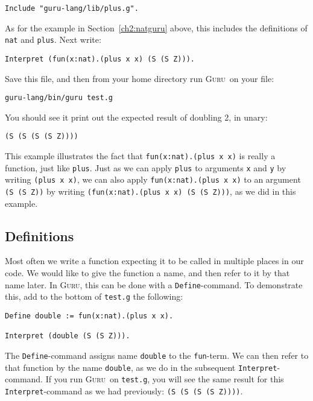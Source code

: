 \documentclass{book}[12pt]
\newcommand{\guru}[0]{\textsc{Guru}}
\begin{document}
\begin{verbatim}
Include "guru-lang/lib/plus.g".
\end{verbatim}

\noindent As for the example in Section~\ref{ch2:natguru} above,
this includes the definitions of \texttt{nat} and \texttt{plus}.
Next write:

\begin{verbatim}
Interpret (fun(x:nat).(plus x x) (S (S Z))).
\end{verbatim}

\noindent Save this file, and then from your home directory run
\guru\ on your file:

\begin{verbatim}
guru-lang/bin/guru test.g
\end{verbatim}

\noindent You should see it print out the expected result of doubling
2, in unary:

\begin{verbatim}
(S (S (S (S Z))))
\end{verbatim}

\noindent This example illustrates the fact that
\texttt{fun(x:nat).(plus x x)} is really a function, just like
\texttt{plus}.  Just as we can apply \texttt{plus} to arguments
\texttt{x} and \texttt{y} by writing \texttt{(plus x x)}, we can also
apply \texttt{fun(x:nat).(plus x x)} to an argument \texttt{(S (S Z))}
by writing \texttt{(fun(x:nat).(plus x x) (S (S Z)))}, as we did in
this example.

\subsection{Definitions}

Most often we write a function expecting it to be called in multiple
places in our code.  We would like to give the function a name, and
then refer to it by that name later.  In \textsc{Guru}, this can be
done with a \texttt{Define}-command. To demonstrate this, add to the
bottom of \texttt{test.g} the following:

\begin{verbatim}
Define double := fun(x:nat).(plus x x).

Interpret (double (S (S Z))).
\end{verbatim}

\noindent The \texttt{Define}-command assigns name \texttt{double} to
the \texttt{fun}-term.  We can then refer to that function by
the name \texttt{double}, as we do in the subsequent
\texttt{Interpret}-command.  If you run \guru\ on \texttt{test.g},
you will see the same result for this \texttt{Interpret}-command
as we had previously: \texttt{(S (S (S (S Z))))}.
\end{document}

